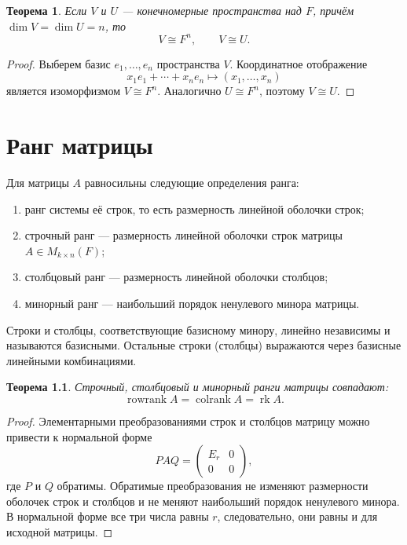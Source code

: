 \documentclass[12pt,a4paper,oneside,openany]{book}
\theoremstyle{definition}
\theoremstyle{plain}
\newtheorem{theorem}{Теорема}[chapter]
\theoremstyle{remark}
\DeclareMathOperator{\rk}{rk}
\begin{document}
\begin{theorem}
Если $V$ и $U$ --- конечномерные пространства над $F$, причём
$\dim V=\dim U=n$, то
\[
  V\cong F^n,
  \qquad
  V\cong U.
\]
\end{theorem}

\begin{proof}
Выберем базис $e_1,\ldots,e_n$ пространства $V$. Координатное
отображение
\[
  x_1e_1+\cdots+x_ne_n\longmapsto(x_1,\ldots,x_n)
\]
является изоморфизмом $V\cong F^n$. Аналогично $U\cong F^n$, поэтому
$V\cong U$.
\end{proof}


\chapter{Ранг матрицы}

Для матрицы $A$ равносильны следующие определения ранга:
\begin{enumerate}[label=\arabic*)]
  \item ранг системы её строк, то есть размерность линейной оболочки
  строк;
  \item строчный ранг --- размерность линейной оболочки строк матрицы
  $A\in M_{k\times n}(F)$;
  \item столбцовый ранг --- размерность линейной оболочки столбцов;
  \item минорный ранг --- наибольший порядок ненулевого минора матрицы.
\end{enumerate}

Строки и столбцы, соответствующие базисному минору, линейно независимы и
называются базисными. Остальные строки (столбцы) выражаются через базисные
линейными комбинациями.


\begin{theorem}
Строчный, столбцовый и минорный ранги матрицы совпадают:
\[
  \operatorname{rowrank}A
  =\operatorname{colrank}A
  =\rk A.
\]
\end{theorem}

\begin{proof}
Элементарными преобразованиями строк и столбцов матрицу можно привести
к нормальной форме
\[
  PAQ=
  \begin{pmatrix}
    E_r&0\\0&0
  \end{pmatrix},
\]
где $P$ и $Q$ обратимы. Обратимые преобразования не изменяют размерности
оболочек строк и столбцов и не меняют наибольший порядок ненулевого
минора. В нормальной форме все три числа равны $r$, следовательно, они
равны и для исходной матрицы.
\end{proof}
\end{document}
